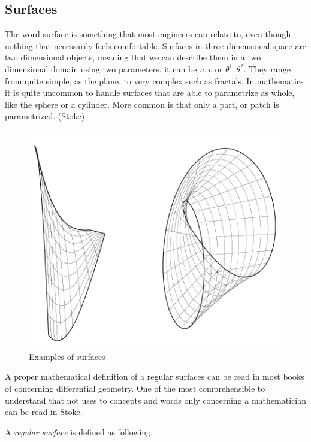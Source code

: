 \subsection{Surfaces}

The word surface is something that most engineers can relate to, even though nothing that necessarily feels comfortable.  Surfaces in three-dimensional space are two dimensional objects, meaning that we can describe them in a two dimensional domain using two parameters, it can be $u,v$ or $\theta^1,\theta^2$. They range from quite simple, as the plane, to very complex such as fractals. In mathematics it is quite uncommon to handle surfaces that are able to parametrize as whole, like the sphere or a cylinder. More common is that only a part, or patch is parametrized.  (Stoke)

\begin{figure}[H]
\centering
\includegraphics[width=0.7\linewidth]{figure/Theory/surfaces.pdf}
 
\caption{Examples of surfaces  }
\end{figure}


A proper mathematical definition of a regular surfaces can be read in most books of concerning differential geometry. One of the most comprehensible to understand that not uses to concepts and words only concerning a mathematician can be read in Stoke.

A \textit{regular surface} is defined as following.

